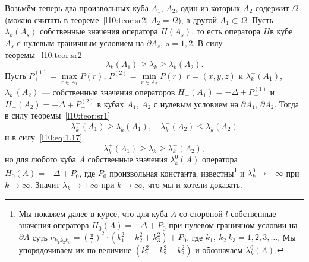 Возьмём теперь два произвольных куба $A_1$, $A_2$, один из которых $A_2$ содержит $\Omega$ (можно считать в теореме~\ref{l10:teor:sr2} $A_2=\widehat{\Omega}$), а другой $A_1\subset\Omega$. Пусть $\lambda_k(A_s)$ собственные значения оператора $H(A_s)$, то есть оператора $H$в кубе $A_s$ с нулевым граничным условием на $\partial A_s$, $s=1,2$. В силу теоремы~\ref{l10:teor:sr2}
\begin{equation}\label{l10:eq:1.17}
	\lambda_k(A_1)\geqslant\lambda_k\geqslant\lambda_k(A_2).
\end{equation}
Пусть $P_{+}^{(1)}=\max\limits_{r\in A_1}P(r)$, $P_{-}^{(2)}=\min\limits_{r\in A_2}P(r)$ $r=(x,y,z)$ и $\lambda_k^{+}(A_1)$, $\lambda_k^{-}(A_2)$ --- собственные значения операторов $H_{+}(A_1)=-\Delta+P_{+}^{(1)}$ и $H_{-}(A_2)=-\Delta+P_{-}^{(2)}$ в кубах $A_1$, $A_2$ с нулевым условием на $\partial A_1$, $\partial A_2$. Тогда в силу теоремы~\ref{l10:teor:sr1}
\begin{equation*}
	\lambda_k^{+}(A_1)\geqslant\lambda_k(A_1),\quad\lambda_k^{-}(A_2)\leqslant\lambda_k(A_2)
\end{equation*} 
и в силу~\eqref{l10:eq:1.17}
\begin{equation*}
	\lambda_k^{+}(A_1)\geqslant\lambda_k\geqslant\lambda_k^{-}(A_2),
\end{equation*} 
но для любого куба $A$ собственные значения $\lambda_k^0(A)$ оператора $H_0(A)=-\Delta+P_0$, где $P_0$ произвольная константа, известны\footnote{Мы покажем далее в курсе, что для куба $A$ со стороной $l$ собственные значения оператора $H_0(A)=-\Delta+P_0$ при нулевом граничном условии на $\partial A$ суть $\displaystyle\nu_{k_1 k_2 k_3}=\left(\frac{\pi}{l}\right)^2\cdot\left(k_1^2+k_2^2+k_3^2\right)+P_0$, где $k_1,\ k_2\ k_3=1,2,3,\ldots$. Мы упорядочиваем их по величине $\left(k_1^2+k_2^2+k_3^2\right)$ и обозначаем $\lambda_k^0(A)$.}  и $\lambda_k^0\to+\infty$ при $k\to\infty$. Значит $\lambda_k\to+\infty$ при $k\to\infty$, что мы и хотели доказать.
